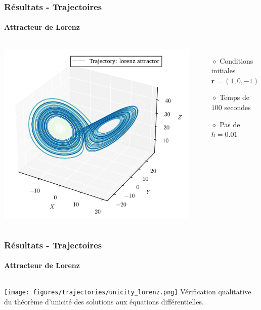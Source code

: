 \begin{frame}
    \frametitle{Résultats - Trajectoires}
    \framesubtitle{Attracteur de Lorenz}
    \begin{columns}
        \centering
        \includegraphics[scale=0.6]{figures/trajectories/traj_lorenz.png}
        \begin{itemize}
            \setlength\itemsep{1em}
            \item[$\diamond$] Conditions initiales $\bm{r} = (1, 0, -1)$ \\
            \item[$\diamond$] Temps de $100$ secondes
            \item[$\diamond$] Pas de $h = 0.01$
        \end{itemize}
    \end{columns}
\end{frame}

\begin{frame}
    \frametitle{Résultats - Trajectoires}
    \framesubtitle{Attracteur de Lorenz}
    \begin{columns}
        \centering
        \texttt{[image: figures/trajectories/unicity\_lorenz.png]}
        Vérification qualitative du théorème d'unicité des solutions aux équations différentielles.
    \end{columns}
\end{frame}

